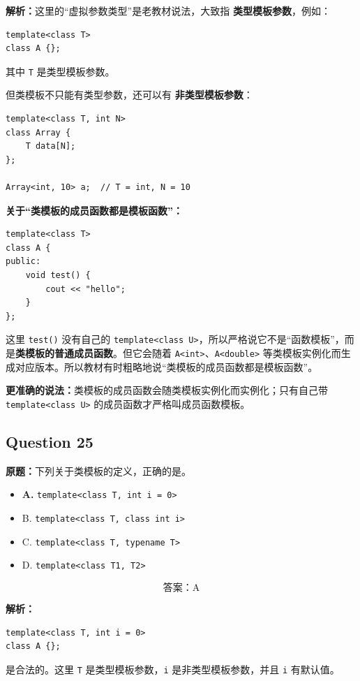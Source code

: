 \documentclass[11pt, a4paper]{article}
\begin{document}
\textbf{解析：}这里的“虚拟参数类型”是老教材说法，大致指 \textbf{类型模板参数}，例如：
\begin{lstlisting}
template<class T>
class A {};
\end{lstlisting}
其中 \texttt{T} 是类型模板参数。

但类模板不只能有类型参数，还可以有 \textbf{非类型模板参数}：
\begin{lstlisting}
template<class T, int N>
class Array {
    T data[N];
};

Array<int, 10> a;  // T = int, N = 10
\end{lstlisting}

\textbf{关于“类模板的成员函数都是模板函数”：}
\begin{lstlisting}
template<class T>
class A {
public:
    void test() {
        cout << "hello";
    }
};
\end{lstlisting}
这里 \texttt{test()} 没有自己的 \texttt{template<class U>}，所以严格说它不是“函数模板”，而是\textbf{类模板的普通成员函数}。但它会随着 \texttt{A<int>}、\texttt{A<double>} 等类模板实例化而生成对应版本。所以教材有时粗略地说“类模板的成员函数都是模板函数”。

\textbf{更准确的说法：}类模板的成员函数会随类模板实例化而实例化；只有自己带 \texttt{template<class U>} 的成员函数才严格叫成员函数模板。


\subsection*{Question 25}
\textbf{原题：}下列关于类模板的定义，正确的是\underline{\hspace{2cm}}。
\begin{itemize}
    \item \textbf{A.} \texttt{template<class T, int i = 0>}
    \item B. \texttt{template<class T, class int i>}
    \item C. \texttt{template<class T, typename T>}
    \item D. \texttt{template<class T1, T2>}
\end{itemize}

\[
\boxed{\text{答案：A}}
\]

\textbf{解析：}
\begin{lstlisting}
template<class T, int i = 0>
class A {};
\end{lstlisting}
是合法的。这里 \texttt{T} 是类型模板参数，\texttt{i} 是非类型模板参数，并且 \texttt{i} 有默认值。
\end{document}
